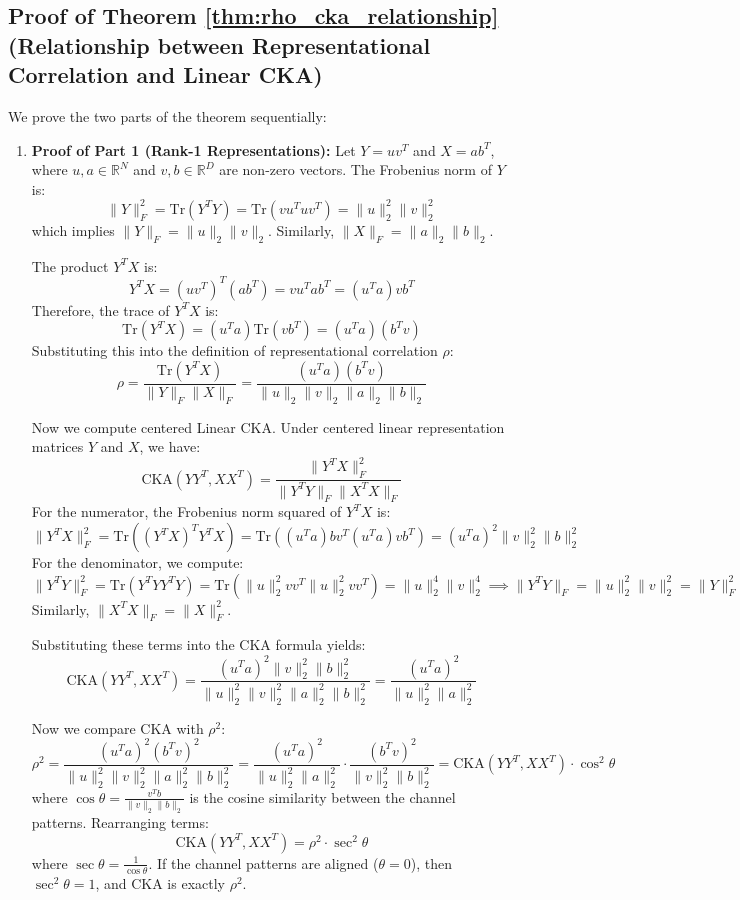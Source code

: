 \documentclass{article}
\theoremstyle{plain}
\theoremstyle{definition}
\theoremstyle{remark}
\begin{document}
\subsection{Proof of Theorem \ref{thm:rho_cka_relationship} (Relationship between Representational Correlation and Linear CKA)}
We prove the two parts of the theorem sequentially:
\begin{enumerate}
    \item \textbf{Proof of Part 1 (Rank-1 Representations):}
    Let $Y = u v^T$ and $X = a b^T$, where $u, a \in \mathbb{R}^N$ and $v, b \in \mathbb{R}^D$ are non-zero vectors. The Frobenius norm of $Y$ is:
    $$\|Y\|_F^2 = \text{Tr}(Y^T Y) = \text{Tr}(v u^T u v^T) = \|u\|_2^2 \|v\|_2^2$$
    which implies $\|Y\|_F = \|u\|_2 \|v\|_2$. Similarly, $\|X\|_F = \|a\|_2 \|b\|_2$.
    
    The product $Y^T X$ is:
    $$Y^T X = (u v^T)^T (a b^T) = v u^T a b^T = (u^T a) v b^T$$
    Therefore, the trace of $Y^T X$ is:
    $$\text{Tr}(Y^T X) = (u^T a) \text{Tr}(v b^T) = (u^T a) (b^T v)$$
    Substituting this into the definition of representational correlation $\rho$:
    $$\rho = \frac{\text{Tr}(Y^T X)}{\|Y\|_F \|X\|_F} = \frac{(u^T a) (b^T v)}{\|u\|_2 \|v\|_2 \|a\|_2 \|b\|_2}$$
    
    Now we compute centered Linear CKA. Under centered linear representation matrices $Y$ and $X$, we have:
    $$\text{CKA}(YY^T, XX^T) = \frac{\|Y^T X\|_F^2}{\|Y^T Y\|_F \|X^T X\|_F}$$
    For the numerator, the Frobenius norm squared of $Y^T X$ is:
    $$\|Y^T X\|_F^2 = \text{Tr}\left( (Y^T X)^T Y^T X \right) = \text{Tr}\left( (u^T a) b v^T (u^T a) v b^T \right) = (u^T a)^2 \|v\|_2^2 \|b\|_2^2$$
    For the denominator, we compute:
    $$\|Y^T Y\|_F^2 = \text{Tr}(Y^T Y Y^T Y) = \text{Tr}\left( \|u\|_2^2 v v^T \|u\|_2^2 v v^T \right) = \|u\|_2^4 \|v\|_2^4 \implies \|Y^T Y\|_F = \|u\|_2^2 \|v\|_2^2 = \|Y\|_F^2$$
    Similarly, $\|X^T X\|_F = \|X\|_F^2$.
    
    Substituting these terms into the CKA formula yields:
    $$\text{CKA}(YY^T, XX^T) = \frac{(u^T a)^2 \|v\|_2^2 \|b\|_2^2}{\|u\|_2^2 \|v\|_2^2 \|a\|_2^2 \|b\|_2^2} = \frac{(u^T a)^2}{\|u\|_2^2 \|a\|_2^2}$$
    
    Now we compare CKA with $\rho^2$:
    $$\rho^2 = \frac{(u^T a)^2 (b^T v)^2}{\|u\|_2^2 \|v\|_2^2 \|a\|_2^2 \|b\|_2^2} = \frac{(u^T a)^2}{\|u\|_2^2 \|a\|_2^2} \cdot \frac{(b^T v)^2}{\|v\|_2^2 \|b\|_2^2} = \text{CKA}(YY^T, XX^T) \cdot \cos^2 \theta$$
    where $\cos \theta = \frac{v^T b}{\|v\|_2 \|b\|_2}$ is the cosine similarity between the channel patterns. Rearranging terms:
    $$\text{CKA}(YY^T, XX^T) = \rho^2 \cdot \sec^2 \theta$$
    where $\sec \theta = \frac{1}{\cos \theta}$. If the channel patterns are aligned ($\theta = 0$), then $\sec^2 \theta = 1$, and CKA is exactly $\rho^2$.
    

\end{enumerate}
\end{document}
